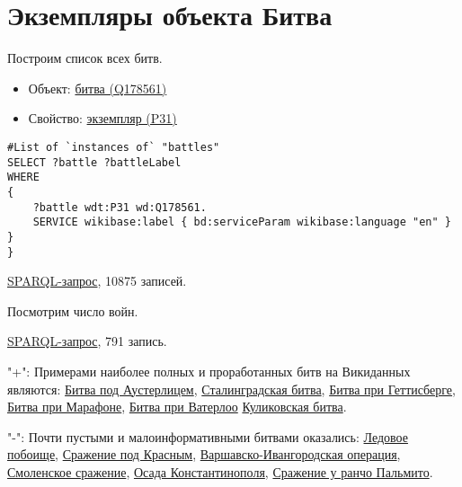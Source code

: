 \section{Экземпляры объекта Битва}
\begin{itemize}

Построим список всех битв.
\end{itemize}

\begin{itemize}
    \item Объект: \href{https://www.wikidata.org/wiki/Q178561}{битва (Q178561)}
    \item Свойство: \href{https://www.wikidata.org/wiki/Property:P31}{экземпляр (P31)}
\end{itemize}

\begin{lstlisting}[language=SPARQL  ]
#List of `instances of` "battles" 
SELECT ?battle ?battleLabel
WHERE
{
    ?battle wdt:P31 wd:Q178561.
    SERVICE wikibase:label { bd:serviceParam wikibase:language "en" }
}
}

\end{lstlisting}

\href{https://query.wikidata.org/#%23added%202017-02%0A%23List%20of%20%60instances%20of%60%20%22national%20park%22%20%0ASELECT%20%3Fbattle%20%3FbattleLabel%0AWHERE%0A%7B%0A%20%20%20%20%3Fbattle%20wdt%3AP31%20wd%3AQ178561.%0A%20%20%20%20SERVICE%20wikibase%3Alabel%20%7B%20bd%3AserviceParam%20wikibase%3Alanguage%20%22en%22%20%7D%0A%7D}{SPARQL-запрос}, 10875 записей.

Посмотрим число войн.

\href{https://query.wikidata.org/#%23List%20of%20%60instances%20of%60%20%22war%22%20%0ASELECT%20%3Fwar%20%3FwarLabel%20WHERE%20%7B%0A%20%20%3Fwar%20wdt%3AP31%20wd%3AQ198.%0A%20%20SERVICE%20wikibase%3Alabel%20%7B%20bd%3AserviceParam%20wikibase%3Alanguage%20%22ru%22.%20%7D%0A%7D SPARQL-запрос}{SPARQL-запрос}, 791 запись.


"+": Примерами наиболее полных и проработанных битв на Викиданных являются:
\href{https://www.wikidata.org/wiki/Q134114}{Битва под Аустерлицем}, 
\href{https://www.wikidata.org/wiki/Q38789}{Сталинградская битва},
\href{https://www.wikidata.org/wiki/Q33132}{Битва при Геттисберге},
\href{https://www.wikidata.org/wiki/Q31900}{Битва при Марафоне},
\href{https://www.wikidata.org/wiki/Q48314}{Битва при Ватерлоо}
\href{https://www.wikidata.org/wiki/Q210354}{Куликовская битва}.

"-": Почти пустыми и малоинформативными битвами оказались:
\href{https://www.wikidata.org/wiki/Q14689}{Ледовое побоище},
\href{https://www.wikidata.org/wiki/Q25809}{Сражение под Красным},
\href{https://www.wikidata.org/wiki/Q28205}{Варшавско-Ивангородская операция},
\href{https://www.wikidata.org/wiki/Q1071578}{Смоленское сражение},
\href{https://www.wikidata.org/wiki/Q27900}{Осада Константинополя},
\href{https://www.wikidata.org/wiki/Q48776}{Сражение у ранчо Пальмито}.